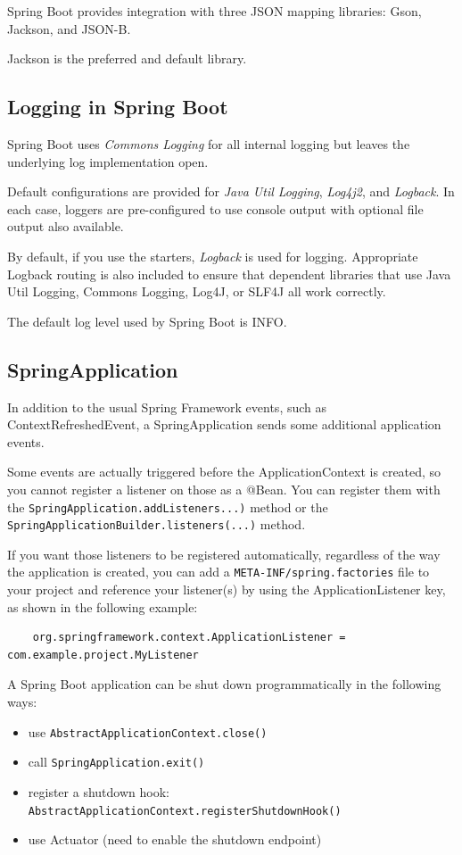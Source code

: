 \documentclass{scrartcl}
\begin{document}
Spring Boot provides integration with three JSON mapping libraries: Gson, Jackson, and JSON-B.

Jackson is the preferred and default library.

\subsection{Logging in Spring Boot}

Spring Boot uses \textit{Commons Logging} for all internal logging but leaves the underlying log implementation open.

Default configurations are provided for \textit{Java Util Logging}, \textit{Log4j2}, and \textit{Logback}. In each case, loggers are pre-configured to use console output with optional file output also available.

By default, if you use the starters, \textit{Logback} is used for logging. Appropriate Logback routing is also included to ensure that dependent libraries that use Java Util Logging, Commons Logging, Log4J, or SLF4J all work correctly.

The default log level used by Spring Boot is INFO.
\subsection{SpringApplication}

In addition to the usual Spring Framework events, such as ContextRefreshedEvent, a SpringApplication sends some additional application events.

Some events are actually triggered before the ApplicationContext is created, so you cannot register a listener on those as a @Bean. You can register them with the \lstinline|SpringApplication.addListeners...)| method or the \lstinline|SpringApplicationBuilder.listeners(...)| method.

If you want those listeners to be registered automatically, regardless of the way the application is created, you can add a \lstinline|META-INF/spring.factories| file to your project and reference your listener(s) by using the ApplicationListener key, as shown in the following example:

\begin{lstlisting}
    org.springframework.context.ApplicationListener = com.example.project.MyListener
\end{lstlisting}

A Spring Boot application can be shut down programmatically in the following ways:
\begin{itemize}
    \item use \lstinline|AbstractApplicationContext.close()|
    \item call \lstinline|SpringApplication.exit()|
    \item register a shutdown hook: \lstinline|AbstractApplicationContext.registerShutdownHook()|
    \item use Actuator (need to enable the shutdown endpoint)
\end{itemize}
\end{document}
